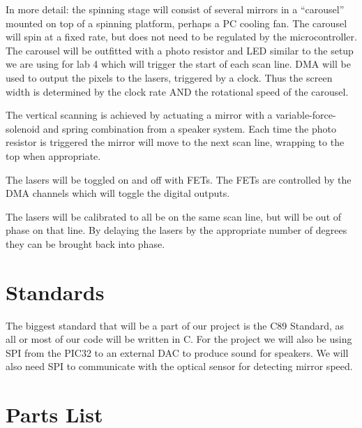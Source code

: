 \documentclass[10pt]{article}
\begin{document}
In more detail: the spinning stage will consist of several mirrors in a ``carousel'' mounted on top of a spinning platform, perhaps a PC cooling fan.
The carousel will spin at a fixed rate, but does not need to be regulated by the microcontroller.
The carousel will be outfitted with a photo resistor and LED similar to the setup we are using for lab 4 which will trigger the start of each scan line.
DMA will be used to output the pixels to the lasers, triggered by a clock.
Thus the screen width is determined by the clock rate AND the rotational speed of the carousel.

The vertical scanning is achieved by actuating a mirror with a variable-force-solenoid and spring combination from a speaker system.
Each time the photo resistor is triggered the mirror will move to the next scan line, wrapping to the top when appropriate.

The lasers will be toggled on and off with FETs.
The FETs are controlled by the DMA channels which will toggle the digital outputs.

The lasers will be calibrated to all be on the same scan line, but will be out of phase on that line.
By delaying the lasers by the appropriate number of degrees they can be brought back into phase.

\section{Standards}
The biggest standard that will be a part of our project is the C89 Standard, as all or most of our code will be written in C.
For the project we will also be using SPI from the PIC32 to an external DAC to produce sound for speakers.
We will also need SPI to communicate with the optical sensor for detecting mirror speed.

\section{Parts List}
\end{document}
